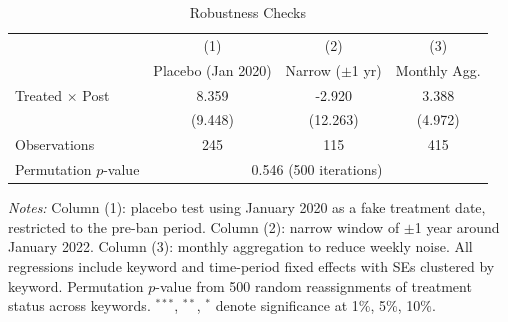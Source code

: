 \begin{table}[htbp]
\centering
\caption{Robustness Checks}
\label{tab:robustness}
\begin{threeparttable}
\begin{tabular}{lccc}
\toprule
 & (1) & (2) & (3) \\
 & Placebo (Jan 2020) & Narrow ($\pm$1 yr) & Monthly Agg. \\
\midrule
Treated $\times$ Post & 8.359 & -2.920 & 3.388 \\
 & (9.448) & (12.263) & (4.972) \\
\midrule
Observations & 245 & 115 & 415 \\
Permutation $p$-value & \multicolumn{3}{c}{0.546 (500 iterations)} \\
\bottomrule
\end{tabular}
\begin{tablenotes}[flushleft]
\small
\item \textit{Notes:} Column (1): placebo test using January 2020 as a fake treatment date, restricted to the pre-ban period. Column (2): narrow window of $\pm$1 year around January 2022. Column (3): monthly aggregation to reduce weekly noise. All regressions include keyword and time-period fixed effects with SEs clustered by keyword. Permutation $p$-value from 500 random reassignments of treatment status across keywords. $^{***}$, $^{**}$, $^{*}$ denote significance at 1\%, 5\%, 10\%.
\end{tablenotes}
\end{threeparttable}
\end{table}

